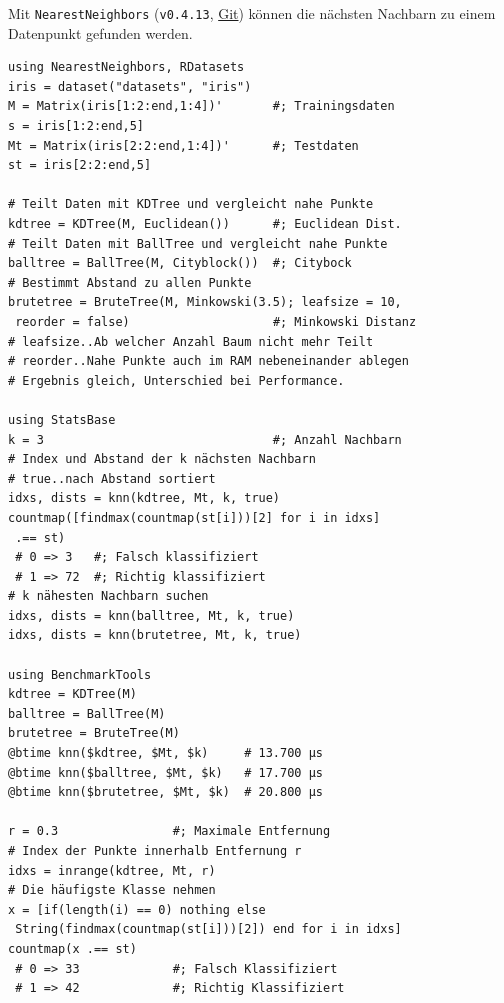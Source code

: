 \documentclass[10pt,twocolumn]{scrartcl}
\begin{document}
Mit \lstinline|NearestNeighbors| (\lstinline|v0.4.13|,
\href{https://github.com/KristofferC/NearestNeighbors.jl}{Git}) können die
nächsten Nachbarn zu einem Datenpunkt gefunden werden.

\begin{lstlisting}
using NearestNeighbors, RDatasets
iris = dataset("datasets", "iris")
M = Matrix(iris[1:2:end,1:4])'       #; Trainingsdaten
s = iris[1:2:end,5]
Mt = Matrix(iris[2:2:end,1:4])'      #; Testdaten
st = iris[2:2:end,5]

# Teilt Daten mit KDTree und vergleicht nahe Punkte
kdtree = KDTree(M, Euclidean())      #; Euclidean Dist.
# Teilt Daten mit BallTree und vergleicht nahe Punkte
balltree = BallTree(M, Cityblock())  #; Citybock
# Bestimmt Abstand zu allen Punkte
brutetree = BruteTree(M, Minkowski(3.5); leafsize = 10,
 reorder = false)                    #; Minkowski Distanz
# leafsize..Ab welcher Anzahl Baum nicht mehr Teilt
# reorder..Nahe Punkte auch im RAM nebeneinander ablegen
# Ergebnis gleich, Unterschied bei Performance.

using StatsBase
k = 3                                #; Anzahl Nachbarn
# Index und Abstand der k nächsten Nachbarn
# true..nach Abstand sortiert
idxs, dists = knn(kdtree, Mt, k, true)
countmap([findmax(countmap(st[i]))[2] for i in idxs]
 .== st)
 # 0 => 3   #; Falsch klassifiziert
 # 1 => 72  #; Richtig klassifiziert
# k nähesten Nachbarn suchen
idxs, dists = knn(balltree, Mt, k, true)
idxs, dists = knn(brutetree, Mt, k, true)

using BenchmarkTools
kdtree = KDTree(M)
balltree = BallTree(M)
brutetree = BruteTree(M)
@btime knn($kdtree, $Mt, $k)     # 13.700 μs
@btime knn($balltree, $Mt, $k)   # 17.700 μs
@btime knn($brutetree, $Mt, $k)  # 20.800 μs

r = 0.3                #; Maximale Entfernung
# Index der Punkte innerhalb Entfernung r
idxs = inrange(kdtree, Mt, r)
# Die häufigste Klasse nehmen
x = [if(length(i) == 0) nothing else
 String(findmax(countmap(st[i]))[2]) end for i in idxs]
countmap(x .== st)
 # 0 => 33             #; Falsch Klassifiziert
 # 1 => 42             #; Richtig Klassifiziert
\end{lstlisting}


\end{document}
